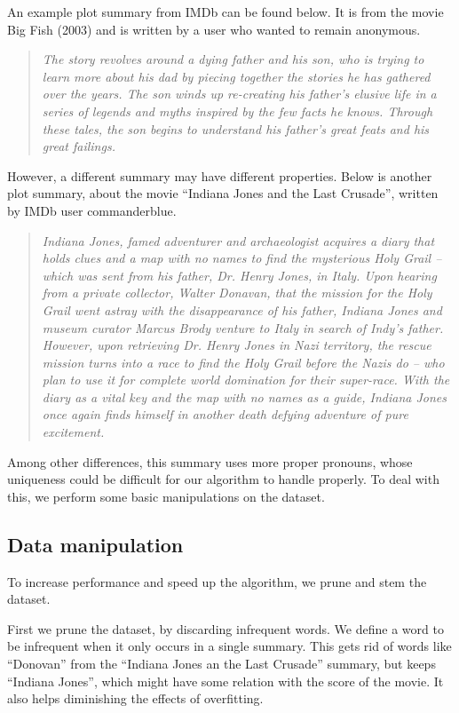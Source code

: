\documentclass{article} %
\begin{document}
An example plot summary from IMDb can be found below. 
It is from the movie Big Fish (2003) and is written by a user who wanted to remain anonymous.
\begin{quotation}
  \emph{The story revolves around a dying father and his son, who is trying to learn more about his dad by piecing together the stories he has gathered over the years.
  The son winds up re-creating his father's elusive life in a series of legends and myths inspired by the few facts he knows.
  Through these tales, the son begins to understand his father's great feats and his great failings.}
\end{quotation}

However, a different summary may have different properties.
Below is another plot summary, about the movie ``Indiana Jones and the Last Crusade'', written by IMDb user commanderblue.
\begin{quotation}
  \emph{Indiana Jones, famed adventurer and archaeologist acquires a diary that holds clues and a map with no names to find the mysterious Holy Grail -- which was sent from his father, Dr. Henry Jones, in Italy. 
  Upon hearing from a private collector, Walter Donavan, that the mission for the Holy Grail went astray with the disappearance of his father, Indiana Jones and museum curator Marcus Brody venture to Italy in search of Indy's father. 
  However, upon retrieving Dr. Henry Jones in Nazi territory, the rescue mission turns into a race to find the Holy Grail before the Nazis do -- who plan to use it for complete world domination for their super-race. 
  With the diary as a vital key and the map with no names as a guide, Indiana Jones once again finds himself in another death defying adventure of pure excitement.}
\end{quotation}

Among other differences, this summary uses more proper pronouns, whose uniqueness could be difficult for our algorithm to handle properly.
To deal with this, we perform some basic manipulations on the dataset.

\subsection{Data manipulation}
To increase performance and speed up the algorithm, we prune and stem the dataset.

First we prune the dataset, by discarding infrequent words. 
We define a word to be infrequent when it only occurs in a single summary. 
This gets rid of words like ``Donovan'' from the ``Indiana Jones an the Last Crusade'' summary, but keeps ``Indiana Jones'', which might have some relation with the score of the movie. It also helps diminishing the effects of overfitting.
\end{document}
